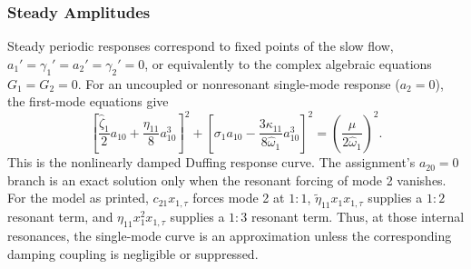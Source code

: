 \documentclass[11pt]{article}
\begin{document}
\subsubsection{Steady Amplitudes}
Steady periodic responses correspond to fixed points of the slow flow, $a_1'=\gamma_1'=a_2'=\gamma_2'=0$, or equivalently to the complex algebraic equations $G_1=G_2=0$. For an uncoupled or nonresonant single-mode response ($a_2=0$), the first-mode equations give
\begin{equation}\label{eq:single-mode-response}
\left[\frac{\hat{\zeta}_1}{2}a_{10}+\frac{\eta_{11}}{8}a_{10}^3\right]^2
+\left[\sigma_1a_{10}-\frac{3\kappa_{11}}{8\hat{\omega}_1}a_{10}^3\right]^2
=\left(\frac{\mu}{2\hat{\omega}_1}\right)^2.
\end{equation}
This is the nonlinearly damped Duffing response curve. The assignment's $a_{20}=0$ branch is an exact solution only when the resonant forcing of mode 2 vanishes. For the model as printed, $c_{21}x_{1,\tau}$ forces mode 2 at $1{:}1$, $\tilde{\eta}_{11}x_1x_{1,\tau}$ supplies a $1{:}2$ resonant term, and $\eta_{11}x_1^2x_{1,\tau}$ supplies a $1{:}3$ resonant term. Thus, at those internal resonances, the single-mode curve is an approximation unless the corresponding damping coupling is negligible or suppressed.
\end{document}
